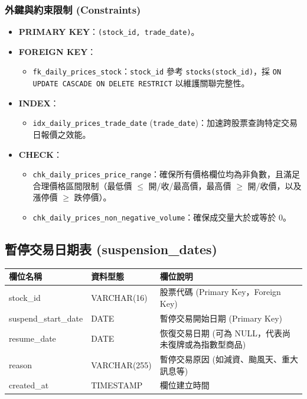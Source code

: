 \documentclass[UTF8, a4paper, 12pt, fontset=none]{ctexart}
\begin{document}
    \subsubsection*{外鍵與約束限制 (Constraints)}
    \begin{itemize}
        \item \textbf{PRIMARY KEY}：\texttt{(stock\_id, trade\_date)}。
        \item \textbf{FOREIGN KEY}：
            \begin{itemize}
                \item \texttt{fk\_daily\_prices\_stock}：\texttt{stock\_id} 參考 \texttt{stocks(stock\_id)}，採 \texttt{ON UPDATE CASCADE ON DELETE RESTRICT} 以維護關聯完整性。
            \end{itemize}
        \item \textbf{INDEX}：
            \begin{itemize}
                \item \texttt{idx\_daily\_prices\_trade\_date} (\texttt{trade\_date})：加速跨股票查詢特定交易日報價之效能。
            \end{itemize}
        \item \textbf{CHECK}：
            \begin{itemize}
                \item \texttt{chk\_daily\_prices\_price\_range}：確保所有價格欄位均為非負數，且滿足合理價格區間限制（最低價 $\le$ 開/收/最高價，最高價 $\ge$ 開/收價，以及漲停價 $\ge$ 跌停價）。
                \item \texttt{chk\_daily\_prices\_non\_negative\_volume}：確保成交量大於或等於 0。
            \end{itemize}
    \end{itemize}

    \subsection{暫停交易日期表 (suspension\_dates)}
    
    \begin{center}
    \begin{tabular}{|l|l|p{8cm}|}
    \hline
    \textbf{欄位名稱} & \textbf{資料型態} & \textbf{欄位說明} \\ \hline
    stock\_id & VARCHAR(16) & 股票代碼 (Primary Key，Foreign Key) \\ \hline
    suspend\_start\_date & DATE & 暫停交易開始日期 (Primary Key) \\ \hline
    resume\_date & DATE & 恢復交易日期 (可為 NULL，代表尚未復牌或為指數型商品) \\ \hline
    reason & VARCHAR(255) & 暫停交易原因 (如減資、颱風天、重大訊息等) \\ \hline
    created\_at & TIMESTAMP & 欄位建立時間 \\ \hline
    \end{tabular}
    \end{center}
\end{document}
